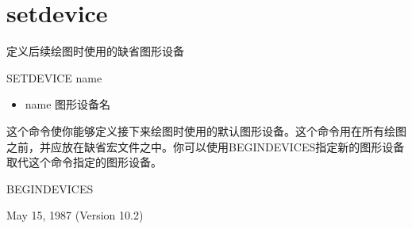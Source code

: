 \section{setdevice}
\label{cmd:setdevice}

定义后续绘图时使用的缺省图形设备

SETDEVICE name

\begin{itemize}
\item name 图形设备名
\end{itemize}

这个命令使你能够定义接下来绘图时使用的默认图形设备。这个命令用在所有绘图之前，并应放在缺省宏文件之中。你可以使用BEGINDEVICES指定新的图形设备取代这个命令指定的图形设备。

BEGINDEVICES

May 15, 1987 (Version 10.2)
